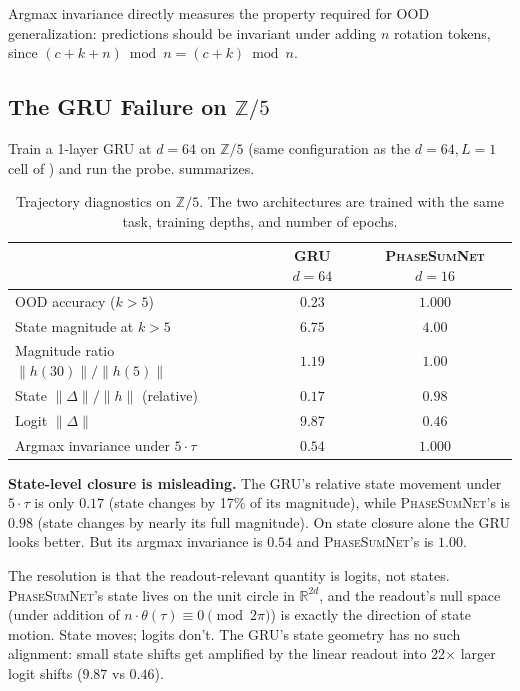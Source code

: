 \documentclass[11pt]{article}
\theoremstyle{definition}
\newcommand{\R}{\mathbb{R}}
\newcommand{\Z}{\mathbb{Z}}
\begin{document}
Argmax invariance directly measures the property required for OOD
generalization: predictions should be invariant under adding $n$
rotation tokens, since $(c + k + n) \bmod n = (c + k) \bmod n$.

\subsection{The GRU Failure on $\Z/5$}

Train a 1-layer GRU at $d=64$ on $\Z/5$ (same configuration as the
$d=64, L=1$ cell of ) and run the probe.
 summarizes.

\begin{table}[h]
\centering
\caption{Trajectory diagnostics on $\Z/5$. The two architectures are
trained with the same task, training depths, and number of epochs.}
\label{tab:trajectory-z5}
\begin{tabular}{lcc}
\toprule
& GRU $d=64$ & \textsc{PhaseSumNet} $d=16$ \\
\midrule
OOD accuracy ($k>5$) & $0.23$ & $\mathbf{1.000}$ \\
State magnitude at $k>5$ & $6.75$ & $4.00$ \\
Magnitude ratio $\|h(30)\|/\|h(5)\|$ & $1.19$ & $1.00$ \\
State $\|\Delta\| / \|h\|$ (relative) & $0.17$ & $0.98$ \\
Logit $\|\Delta\|$ & $9.87$ & $0.46$ \\
Argmax invariance under $5\cdot\tau$ & $0.54$ & $\mathbf{1.000}$ \\
\bottomrule
\end{tabular}
\end{table}

\textbf{State-level closure is misleading.} The GRU's relative state
movement under $5\cdot\tau$ is only $0.17$ (state changes by 17\%
of its magnitude), while \textsc{PhaseSumNet}'s is $0.98$ (state
changes by nearly its full magnitude). On state closure alone the
GRU looks better. But its argmax invariance is $0.54$ and
\textsc{PhaseSumNet}'s is $1.00$.

The resolution is that the readout-relevant quantity is logits, not
states. \textsc{PhaseSumNet}'s state lives on the unit circle in
$\R^{2d}$, and the readout's null space (under addition of
$n \cdot \theta(\tau) \equiv 0 \pmod{2\pi}$) is exactly the
direction of state motion. State moves; logits don't. The GRU's
state geometry has no such alignment: small state shifts get
amplified by the linear readout into 22$\times$ larger logit
shifts ($9.87$ vs $0.46$).
\end{document}
